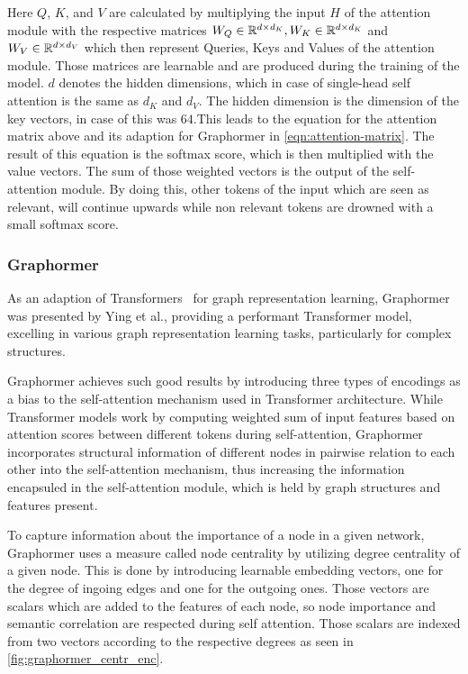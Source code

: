 Here $Q$, $K$, and $V$ are calculated by multiplying the input $H$ of the attention module with the respective matrices $W_Q\in\mathbb{R}^{d\times d_K}, W_K\in\mathbb{R}^{d\times d_K}$ and $ W_V\in\mathbb{R}^{d\times d_V}$ which then represent Queries, Keys and Values of the attention module. Those matrices are learnable and are produced during the training of the model. $d$ denotes the hidden dimensions, which in case of single-head self attention is the same as $d_K$ and $d_V$. The hidden dimension is the dimension of the key vectors, in case of \cite{vaswani2017attention} this was $64$.This leads to the equation for the attention matrix above and its adaption for Graphormer in \autoref{eqn:attention-matrix}. The result of this equation is the softmax score, which is then multiplied with the value vectors. The sum of those weighted vectors is the output of the self-attention module. By doing this, other tokens of the input which are seen as relevant, will continue upwards while non relevant tokens are drowned with a small softmax score.

\subsubsection{Graphormer}
As an adaption of Transformers~\cite{vaswani2017attention} for graph representation learning, Graphormer~\cite{2021graphormer} was presented by Ying et al., providing a performant Transformer model, excelling in various graph representation learning tasks, particularly for complex structures.

Graphormer achieves such good results by introducing three types of encodings as a bias to the self-attention mechanism used in Transformer architecture. While Transformer models work by computing weighted sum of input features based on attention scores between different tokens during self-attention, Graphormer incorporates structural information of different nodes in pairwise relation to each other into the self-attention mechanism, thus increasing the information encapsuled in the self-attention module, which is held by graph structures and features present.

To capture information about the importance of a node in a given network, Graphormer uses a measure called node centrality by utilizing degree centrality of a given node. This is done by introducing learnable embedding vectors, one for the degree of ingoing edges and one for the outgoing ones. Those vectors are scalars which are added to the features of each node, so node importance and semantic correlation are respected during self attention. Those scalars are indexed from two vectors according to the respective degrees as seen in \autoref{fig:graphormer_centr_enc}.

